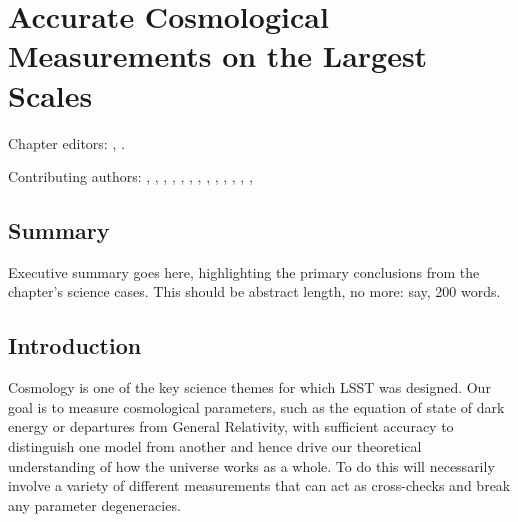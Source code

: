 
\chapter[Cosmology]{Accurate Cosmological Measurements on the Largest Scales}
\def\chpname{cosmo}\label{chp:\chpname}

Chapter editors:
,
.

Contributing authors:
,
,
,
,
,
,
,
,
,
,
,
,
,

\section*{Summary}

Executive summary goes here, highlighting the primary conclusions from
the chapter's science cases. This should be abstract length, no more:
say, 200 words.


\section{Introduction}
\label{sec:\chpname:intro}

Cosmology is one of the key science themes for which LSST was
designed. Our goal is to measure cosmological parameters, such as the
equation of state of dark energy or departures from General
Relativity, with sufficient accuracy to distinguish one model from
another and hence drive our theoretical understanding of how the
universe works as a whole. To do this will necessarily involve a
variety of different measurements that can act as cross-checks and break
any parameter degeneracies.

